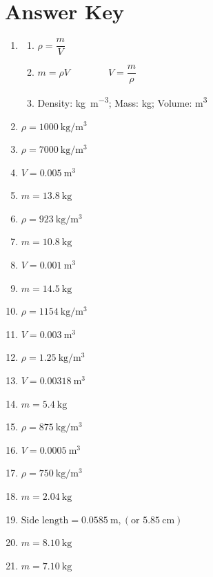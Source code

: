 \documentclass[11pt]{article}
\begin{document}
\section*{Answer Key}
\begin{enumerate}
\item
\begin{enumerate}
\item $\rho = \dfrac{m}{V}$
\item $m = \rho V \qquad\qquad V = \dfrac{m}{\rho}$
\item Density: \si{\kilogram\per\metre\cubed}; Mass: \si{\kilogram}; Volume: \si{\metre\cubed}
\end{enumerate}

\item $\rho = \SI{1000}{\kilogram\per\metre\cubed}$
\item $\rho = \SI{7000}{\kilogram\per\metre\cubed}$
\item $V = \SI{0.005}{\metre\cubed}$
\item $m = \SI{13.8}{\kilogram}$
\item $\rho = \SI{923}{\kilogram\per\metre\cubed}$
\item $m = \SI{10.8}{\kilogram}$
\item $V = \SI{0.001}{\metre\cubed}$
\item $m = \SI{14.5}{\kilogram}$
\item $\rho = \SI{1154}{\kilogram\per\metre\cubed}$
\item $V = \SI{0.003}{\metre\cubed}$
\item $\rho = \SI{1.25}{\kilogram\per\metre\cubed}$
\item $V = \SI{0.00318}{\metre\cubed}$
\item $m = \SI{5.4}{\kilogram}$
\item $\rho = \SI{875}{\kilogram\per\metre\cubed}$
\item $V = \SI{0.0005}{\metre\cubed}$

\item $\rho = \SI{750}{\kilogram\per\metre\cubed}$
\item $m = \SI{2.04}{\kilogram}$
\item $\text{Side length} = \SI{0.0585}{\metre}, (\text{or } \SI{5.85}{\centi\metre})$
\item $m = \SI{8.10}{\kilogram}$
\item $m = \SI{7.10}{\kilogram}$
\end{enumerate}
\end{document}
